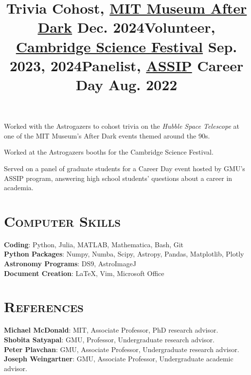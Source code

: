 \documentclass[marg, centered]{res}
\begin{document}
\begin{resume}
\vspace{-0.2cm}
\title{\textbf{Trivia Cohost}, \href{https://mitmuseum.mit.edu/programs/mit-museum-after-dark}{\color{dkbu} MIT Museum After Dark} \hfill \textbf{Dec. 2024}}
\begin{position}
{\small Worked with the Astrogazers to cohost trivia on the \textit{Hubble Space Telescope} at one of the MIT Museum's After Dark events themed around the 90s.}
\end{position}

\vspace{-0.2cm}
\title{\textbf{Volunteer}, \href{https://cambridgesciencefestival.org/}{\color{dkbu} Cambridge Science Festival} \hfill \textbf{Sep. 2023, 2024}}
\begin{position}
{\small Worked at the Astrogazers booths for the Cambridge Science Festival.}
\end{position}

\vspace{-0.2cm}
\title{\textbf{Panelist}, \href{https://science.gmu.edu/assip}{\color{dkbu} ASSIP} Career Day \hfill \textbf{Aug. 2022}}
\begin{position}
{\small Served on a panel of graduate students for a Career Day event hosted by GMU's ASSIP program, answering high school students' questions about a career in academia.}
\end{position}


\section{\scshape \bfseries Computer Skills}

\textbf{Coding}{: Python, Julia, MATLAB, Mathematica, Bash, Git} \\ 
\textbf{Python Packages}{: Numpy, Numba, Scipy, Astropy, Pandas, Matplotlib, Plotly} \\
\textbf{Astronomy Programs}{: DS9, AstroImageJ} \\
\textbf{Document Creation}{: \LaTeX, Vim, Microsoft Office} \\


\section{{\scshape \bfseries References}}
\textbf{Michael McDonald}{: MIT, Associate Professor, PhD research advisor.}\\
\textbf{Shobita Satyapal}{: GMU, Professor, Undergraduate research advisor.}\\
\textbf{Peter Plavchan}{: GMU, Associate Professor, Undergraduate research advisor.}\\
\textbf{Joseph Weingartner}{: GMU,  Associate Professor, Undergraduate academic advisor.}\\

\end{resume}
\end{document}
